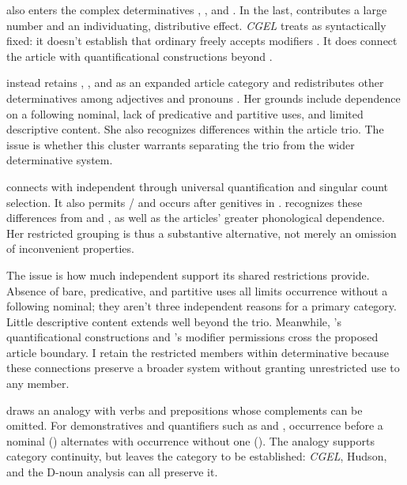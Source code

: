 \documentclass[12pt]{article}
\begin{document}
 also enters the complex determinatives , , and . In the last,  contributes a large number and  an individuating, distributive effect. \textit{CGEL} treats  as syntactically fixed: it doesn't establish that ordinary  freely accepts modifiers \citep[392--394]{huddleston2002}. It does connect the article with quantificational constructions beyond .

\textcite[153--158]{spinillo2004reconceptualising} instead retains , , and  as an expanded article category and redistributes other determinatives among adjectives and pronouns \citep[194--195]{spinillo2004reconceptualising}. Her grounds include dependence on a following nominal, lack of predicative and partitive uses, and limited descriptive content. She also recognizes differences within the article trio. The issue is whether this cluster warrants separating the trio from the wider determinative system.

 connects with independent  through universal quantification and singular count selection. It also permits / and occurs after genitives in . \textcite[156--158]{spinillo2004reconceptualising} recognizes these differences from  and , as well as the articles' greater phonological dependence. Her restricted grouping is thus a substantive alternative, not merely an omission of inconvenient properties.

The issue is how much independent support its shared restrictions provide. Absence of bare, predicative, and partitive uses all limits occurrence without a following nominal; they aren't three independent reasons for a primary category. Little descriptive content extends well beyond the trio. Meanwhile, 's quantificational constructions and 's modifier permissions cross the proposed article boundary. I retain the restricted members within determinative because these connections preserve a broader system without granting unrestricted use to any member.

\textcite[140--144]{spinillo2004reconceptualising} draws an analogy with verbs and prepositions whose complements can be omitted. For demonstratives and quantifiers such as  and , occurrence before a nominal () alternates with occurrence without one (). The analogy supports category continuity, but leaves the category to be established: \textit{CGEL}, Hudson, and the D-noun analysis can all preserve it.
\end{document}
